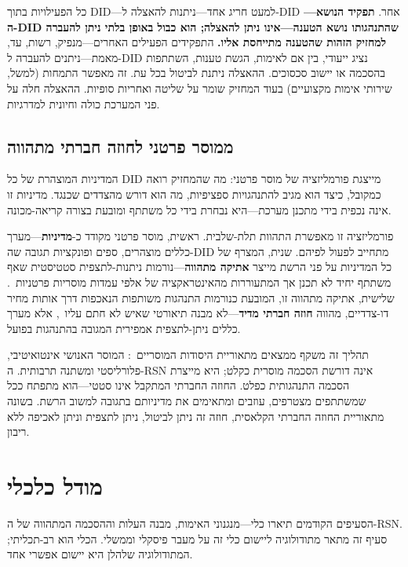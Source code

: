 \documentclass[11pt,a4paper,twocolumn]{article}
\begin{document}
כל הפעילויות בתוך DID---למעט חריג אחד---ניתנות להאצלה ל-DID אחר. \textbf{תפקיד הנושא---ה-DID שהתנהגותו נושא הטענה---אינו ניתן להאצלה; הוא כבול באופן בלתי ניתן להעברה למחזיק הזהות שהטענה מתייחסת אליו.} התפקידים הפעילים האחרים---מנפיק, רשות, עד, מאמת---ניתנים להעברה ל-DID נציג ייעודי, בין אם לאימות, הגשת טענות, השתתפות בהסכמה או יישוב סכסוכים. ההאצלה ניתנת לביטול בכל עת. זה מאפשר התמחות (למשל, שירותי אימות מקצועיים) בעוד המחזיק שומר על שליטה ואחריות סופיות. ההאצלה חלה על פני המערכת כולה וחיונית למדרגיות.

\subsection{ממוסר פרטני לחוזה חברתי מתהווה}

המדיניות המוצהרת של כל DID מייצגת פורמליזציה של מוסר פרטני: מה שהמחזיק רואה כמקובל, כיצד הוא מגיב להתנהגויות ספציפיות, מה הוא דורש מהצדדים שכנגד. מדיניות זו אינה נכפית בידי מתכנן מערכת---היא נבחרת בידי כל משתתף ומובעת בצורה קריאה-מכונה.

פורמליזציה זו מאפשרת התהוות תלת-שלבית. ראשית, מוסר פרטני מקודד כ-\textbf{מדיניות}---מערך כללים מוצהרים, ספים ופונקציות תגובה שה-DID מתחייב לפעול לפיהם. שנית, המצרף של כל המדיניות על פני הרשת מייצר \textbf{אתיקה מתהווה}---נורמות ניתנות-לתצפית סטטיסטית שאף משתתף יחיד לא תכנן אך המתעוררות מהאינטראקציה של אלפי עמדות מוסריות פרטניות~\cite{durkheim1893}. שלישית, אתיקה מתהווה זו, המובעת כנורמות התנהגות משותפות הנאכפות דרך אותות מחיר דו-צדדיים, מהווה \textbf{חוזה חברתי מדיד}---לא מבנה תיאורטי שאיש לא חתם עליו~\cite{rawls1971}, אלא מערך כללים ניתן-לתצפית אמפירית המגובה בהתנהגות בפועל.

תהליך זה משקף ממצאים מתאוריית היסודות המוסריים~\cite{haidt2012}: המוסר האנושי אינטואיטיבי, פלורליסטי ומשתנה תרבותית. ה-RSN אינה דורשת הסכמה מוסרית כקלט; היא מייצרת הסכמה התנהגותית כפלט. החוזה החברתי המתקבל אינו סטטי---הוא מתפתח ככל שמשתתפים מצטרפים, עוזבים ומתאימים את מדיניותם בתגובה למשוב הרשת. בשונה מתאוריית החוזה החברתי הקלאסית, חוזה זה ניתן לביטול, ניתן לתצפית וניתן לאכיפה ללא ריבון.

\section{מודל כלכלי}

הסעיפים הקודמים תיארו כלי---מנגנוני האימות, מבנה העלות וההסכמה המתהווה של ה-RSN. סעיף זה מתאר מתודולוגיה ליישום כלי זה על מעבר פיסקלי וממשלי. הכלי הוא רב-תכליתי; המתודולוגיה שלהלן היא יישום אפשרי אחד.
\end{document}
